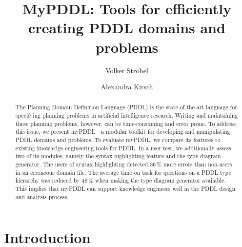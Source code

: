 \documentclass[runningheads]{llncs}
\begin{document}
%
\title{MyPDDL: Tools for efficiently creating PDDL domains and
  problems}
%
%
\author{Volker Strobel \and
Alexandra Kirsch}
%
%
%
\maketitle              %
%
\begin{abstract}
  The Planning Domain Definition Language (PDDL) is the
  state-of-the-art language for specifying planning problems in
  artificial intelligence research. Writing and maintaining these
  planning problems, however, can be time-consuming and error
  prone. To address this issue, we present myPDDL---a modular toolkit
  for developing and manipulating PDDL domains and problems. To
  evaluate myPDDL, we compare its features to existing knowledge
  engineering tools for PDDL. In a user test, we additionally assess
  two of its modules, namely the syntax highlighting feature and the
  type diagram generator. The users of syntax highlighting detected
  36\,\% more errors than non-users in an erroneous domain file. The
  average time on task for questions on a PDDL type hierarchy was
  reduced by 48\,\% when making the type diagram generator
  available. This implies that myPDDL can support knowledge engineers
  well in the PDDL design and analysis process.
  
\end{abstract}
%
%

\section{Introduction}
\label{sec:introduction}
\end{document}
